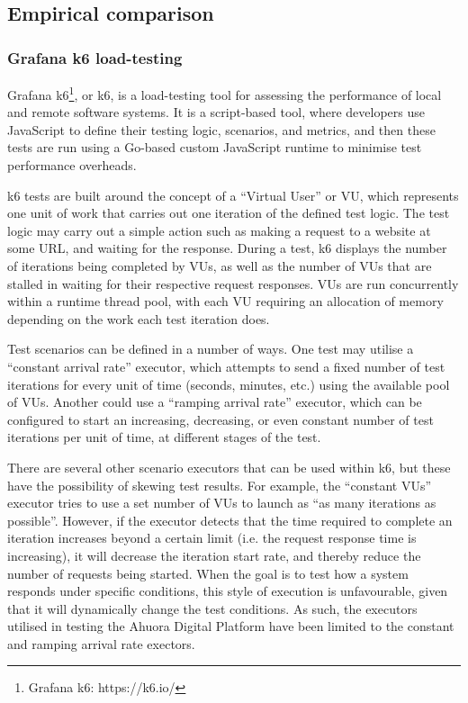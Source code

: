 \subsection{Empirical comparison}
\subsubsection{Grafana k6 load-testing}

Grafana k6\footnote{Grafana k6: https://k6.io/}, or k6, is a load-testing tool for assessing the performance of local and remote software systems. It is a script-based tool, where developers use JavaScript to define their testing logic, scenarios, and metrics, and then these tests are run using a Go-based custom JavaScript runtime to minimise test performance overheads.

k6 tests are built around the concept of a ``Virtual User'' or VU, which represents one unit of work that carries out one iteration of the defined test logic. The test logic may carry out a simple action such as making a request to a website at some URL, and waiting for the response. During a test, k6 displays the number of iterations being completed by VUs, as well as the number of VUs that are stalled in waiting for their respective request responses. VUs are run concurrently within a runtime thread pool, with each VU requiring an allocation of memory depending on the work each test iteration does.

Test scenarios can be defined in a number of ways. One test may utilise a ``constant arrival rate'' executor, which attempts to send a fixed number of test iterations for every unit of time (seconds, minutes, etc.) using the available pool of VUs. Another could use a ``ramping arrival rate'' executor, which can be configured to start an increasing, decreasing, or even constant number of test iterations per unit of time, at different stages of the test.

There are several other scenario executors that can be used within k6, but these have the possibility of skewing test results. For example, the ``constant VUs'' executor tries to use a set number of VUs to launch as ``as many iterations as possible''. However, if the executor detects that the time required to complete an iteration increases beyond a certain limit (i.e. the request response time is increasing), it will decrease the iteration start rate, and thereby reduce the number of requests being started. When the goal is to test how a system responds under specific conditions, this style of execution is unfavourable, given that it will dynamically change the test conditions. As such, the executors utilised in testing the Ahuora Digital Platform have been limited to the constant and ramping arrival rate exectors.

